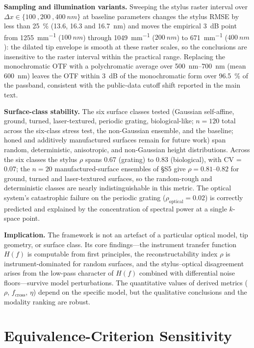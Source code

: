\documentclass[review,12pt]{elsarticle}
\begin{document}
\textbf{Sampling and illumination variants.} Sweeping the stylus raster interval over $\Delta x \in \{\SI{100}{},\SI{200}{},\SI{400}{nm}\}$ at baseline parameters changes the stylus RMSE by less than \SI{25}{\percent} (\SI{13.6}{}, \SI{16.3}{} and \SI{16.7}{nm}) and moves the empirical \SI{3}{dB} point from \SI{1255}{mm^{-1}} ($\SI{100}{nm}$) through \SI{1049}{mm^{-1}} ($\SI{200}{nm}$) to \SI{671}{mm^{-1}} ($\SI{400}{nm}$): the dilated tip envelope is smooth at these raster scales, so the conclusions are insensitive to the raster interval within the practical range. Replacing the monochromatic OTF with a polychromatic average over \SIrange{500}{700}{nm} (mean \SI{600}{nm}) leaves the OTF within \SI{3}{dB} of the monochromatic form over \SI{96.5}{\percent} of the passband, consistent with the public-data cutoff shift reported in the main text.

\textbf{Surface-class stability.} The six surface classes tested (Gaussian self-affine, ground, turned, laser-textured, periodic grating, biological-like; $n = 120$ total across the six-class stress test, the non-Gaussian ensemble, and the baseline; honed and additively manufactured surfaces remain for future work) span random, deterministic, anisotropic, and non-Gaussian height distributions. Across the six classes the stylus $\rho$ spans 0.67 (grating) to 0.83 (biological), with CV = 0.07; the $n=20$ manufactured-surface ensembles of \S S5 give $\rho = 0.81$--$0.82$ for ground, turned and laser-textured surfaces, so the random-rough and deterministic classes are nearly indistinguishable in this metric. The optical system's catastrophic failure on the periodic grating ($\rho_\mathrm{optical} = 0.02$) is correctly predicted and explained by the concentration of spectral power at a single $k$-space point.

\textbf{Implication.} The framework is not an artefact of a particular optical model, tip geometry, or surface class. Its core findings---the instrument transfer function $H(f)$ is computable from first principles, the reconstructability index $\rho$ is instrument-dominated for random surfaces, and the stylus--optical disagreement arises from the low-pass character of $H(f)$ combined with differential noise floors---survive model perturbations. The quantitative values of derived metrics ($\rho$, $f_\mathrm{cross}$, $\eta$) depend on the specific model, but the qualitative conclusions and the modality ranking are robust.

\section{Equivalence-Criterion Sensitivity}
\label{S11}
\end{document}
